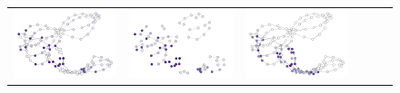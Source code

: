 \begin{figure}[tbhp]
\begin{center}
\begin{tabular}{cccccc}
			{\includegraphics[width=\imgwidth, align=c, trim={0 0 0 0}, clip]{proteins/46_437_134nodes_0_0_unsup.pdf}} &
			{\includegraphics[width=\imgwidth, align=c, trim={0 0 0 0}, clip]{proteins/46_437_79nodes_0_0_unsup_pooled.pdf}} &
			{\includegraphics[width=\imgwidth, align=c, trim={0 0 0 0}, clip]{proteins/46_437_134nodes_0_0.pdf}} &

\end{tabular}
\end{center}
\end{figure}
